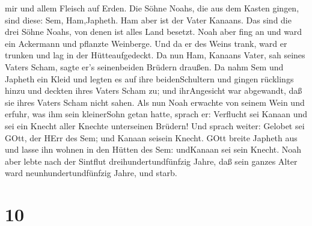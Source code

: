 mir und allem Fleisch auf Erden.  Die Söhne Noahs, die aus
dem Kasten gingen, sind diese: Sem, Ham,Japheth. Ham aber ist der Vater
Kanaans.  Das sind die drei Söhne Noahs, von denen ist
alles Land besetzt.  Noah aber fing an und ward ein
Ackermann und pflanzte Weinberge.  Und da er des Weins
trank, ward er trunken und lag in der Hütteaufgedeckt.  Da
nun Ham, Kanaans Vater, sah seines Vaters Scham, sagte er's seinenbeiden
Brüdern draußen.  Da nahm Sem und Japheth ein Kleid und
legten es auf ihre beidenSchultern und gingen rücklings hinzu und
deckten ihres Vaters Scham zu; und ihrAngesicht war abgewandt, daß sie
ihres Vaters Scham nicht sahen.  Als nun Noah erwachte von
seinem Wein und erfuhr, was ihm sein kleinerSohn getan hatte,
 sprach er: Verflucht sei Kanaan und sei ein Knecht aller
Knechte unterseinen Brüdern!  Und sprach weiter: Gelobet
sei GOtt, der HErr des Sem; und Kanaan seisein Knecht. 
GOtt breite Japheth aus und lasse ihn wohnen in den Hütten des Sem:
undKanaan sei sein Knecht.  Noah aber lebte nach der
Sintflut dreihundertundfünfzig Jahre,  daß sein ganzes
Alter ward neunhundertundfünfzig Jahre, und starb.

\hypertarget{section-9}{%
\section{10}\label{section-9}}

